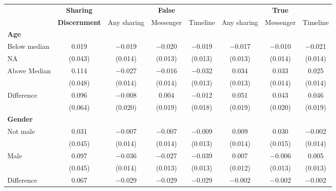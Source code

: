 
\begin{tabular}[t]{lccccccc}
 & \textbf{Sharing} &  & \textbf{False} &  &  & \textbf{True} & \\
 & \textbf{Discernment} & Any sharing & Messenger & Timeline & Any sharing & Messenger & Timeline\\\cmidrule(lr){2-2} \cmidrule(lr){3-5} \cmidrule(lr){6-8} \multicolumn{4}{l}{\textbf{Age}} \rule{0pt}{1.2\normalbaselineskip}\\
\hspace{1em} Below median & \num{0.019} & \num{-0.019} & \num{-0.020} & \num{-0.019} & \num{-0.017} & \num{-0.010} & \num{-0.021}\\
\hspace{2em}NA & (\num{0.043}) & (\num{0.014}) & (\num{0.013}) & (\num{0.013}) & (\num{0.013}) & (\num{0.014}) & (\num{0.014})\\
\hspace{1em} Above Median & \num{0.114} & \num{-0.027} & \num{-0.016} & \num{-0.032} & \num{0.034} & \num{0.033} & \num{0.025}\\
\hspace{2em} & (\num{0.048}) & (\num{0.014}) & (\num{0.014}) & (\num{0.013}) & (\num{0.013}) & (\num{0.014}) & (\num{0.014})\\\cmidrule(lr){2-8}
\hspace{1em} Difference & \num{0.096} & \num{-0.008} & \num{0.004} & \num{-0.012} & \num{0.051} & \num{0.043} & \num{0.046}\\
 & (\num{0.064}) & (\num{0.020}) & (\num{0.019}) & (\num{0.018}) & (\num{0.019}) & (\num{0.020}) & (\num{0.019})\\\multicolumn{4}{l}{\textbf{Gender}} \rule{0pt}{1.2\normalbaselineskip}\\
\hspace{1em} Not male & \num{0.031} & \num{-0.007} & \num{-0.007} & \num{-0.009} & \num{0.009} & \num{0.030} & \num{-0.002}\\
 & (\num{0.045}) & (\num{0.014}) & (\num{0.014}) & (\num{0.013}) & (\num{0.014}) & (\num{0.015}) & (\num{0.014})\\
\hspace{1em} Male & \num{0.097} & \num{-0.036} & \num{-0.027} & \num{-0.039} & \num{0.007} & \num{-0.006} & \num{0.005}\\
 & (\num{0.045}) & (\num{0.014}) & (\num{0.013}) & (\num{0.013}) & (\num{0.012}) & (\num{0.013}) & (\num{0.013})\\\cmidrule(lr){2-8}
\hspace{1em} Difference & \num{0.067} & \num{-0.029} & \num{-0.029} & \num{-0.029} & \num{-0.002} & \num{-0.002} & \num{-0.002}\\

\end{tabular}
